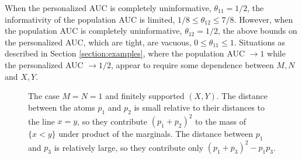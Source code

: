 \documentclass[12pt]{article}
\DeclareMathOperator{\AUC}{AUC}
\newcommand{\cind}{\perp \!\!\! \perp}
\newcommand{\aucindiv}{\theta_{11}}%
\newcommand{\aucpop}{\theta_{12}}%
\begin{document}
When the personalized AUC is completely uninformative, $\aucindiv=1/2$,
the informativity of the population AUC is limited,
$1/8 \le \aucpop \le 7/8$. However, when the population AUC is
completely uninformative, $\aucpop=1/2$, the above bounds on the personalized AUC, which are tight, are vacuous, $0\le\aucindiv\le 1$. Situations as described in Section \ref{section:examples}, where the population AUC $\to 1$ while the personalized AUC $\to 1/2$, appear to require some dependence between $M,N$ and $X,Y$. %



\begin{figure}[!tbp]
  \centering
  \caption{The case $M=N=1$ and finitely supported $(X,Y)$. The
    distance between the atoms $p_1$ and $p_2$ is small relative to
    their distances to the line $x=y$, so they contribute
    $(p_1+p_2)^2$ to the mass of $\{x<y\}$ under product of the
    marginals. The distance between $p_1$ and $p_3$ is relatively
    large, so they contribute only
    $(p_1+p_3)^2-p_1p_3$.}  \label{fig:inequality}
\end{figure}
\end{document}
